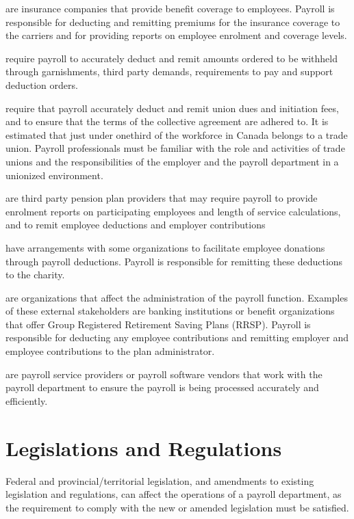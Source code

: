 \documentclass[letterpaper,10pt,english]{sphinxmanual}
\begin{document}
\sphinxAtStartPar
{} are insurance companies that provide benefit coverage to employees.
Payroll is responsible for deducting and remitting premiums for the insurance coverage to the
carriers and for providing reports on employee enrolment and coverage levels.

\sphinxAtStartPar
{} require payroll to accurately deduct and remit amounts ordered to be
withheld through garnishments, third party demands, requirements to pay and support
deduction orders.

\sphinxAtStartPar
{} require that payroll accurately deduct and remit union dues and initiation fees, and to
ensure that the terms of the collective agreement are adhered to. It is estimated that just under
one\sphinxhyphen{}third of the workforce in Canada belongs to a trade union. Payroll professionals must be
familiar with the role and activities of trade unions and the responsibilities of the employer
and the payroll department in a unionized environment.

\sphinxAtStartPar
{} are third party pension plan providers that may require payroll to provide
enrolment reports on participating employees and length of service calculations, and to remit
employee deductions and employer contributions

\sphinxAtStartPar
{} have arrangements with some organizations to facilitate employee donations
through payroll deductions. Payroll is responsible for remitting these deductions to the
charity.

\sphinxAtStartPar
{} are organizations that affect the administration of the payroll
function. Examples of these external stakeholders are banking institutions or benefit
organizations that offer Group Registered Retirement Saving Plans (RRSP). Payroll is
responsible for deducting any employee contributions and remitting employer and employee
contributions to the plan administrator.

\sphinxAtStartPar
{} are payroll service providers or payroll software vendors that
work with the payroll department to ensure the payroll is being processed accurately and
efficiently.


\section{Legislations and Regulations}
\label{\detokenize{compliance:legislations-and-regulations}}
\sphinxAtStartPar
Federal and provincial/territorial legislation, and amendments to existing legislation and
regulations, can affect the operations of a payroll department, as the requirement to comply
with the new or amended legislation must be satisfied.
\end{document}
